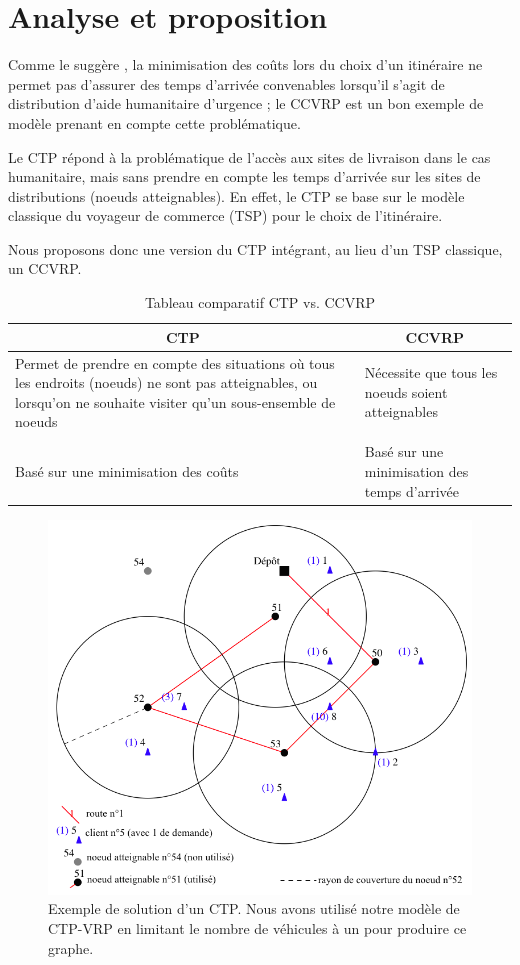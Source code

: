 \documentclass[12pt, a4paper, onecolumn, twoside,french,cleardoublepage=plain,openany]{article}
\begin{document}
\section{Analyse et proposition}

Comme le suggère \cite{campbell_routing_2008}, la minimisation des coûts lors du choix d’un itinéraire ne permet pas d’assurer des temps d’arrivée convenables lorsqu’il s’agit de distribution d’aide humanitaire d’urgence ; le CCVRP est un bon exemple de modèle prenant en compte cette problématique.

Le CTP répond à la problématique de l’accès aux sites de livraison dans le cas humanitaire, mais sans prendre en compte les temps d’arrivée sur les sites de distributions (noeuds atteignables). En effet, le CTP se base sur le modèle classique du voyageur de commerce (TSP) pour le choix de l’itinéraire.

Nous proposons donc une version du CTP intégrant, au lieu d’un TSP classique, un CCVRP.
\begin{table}[h] \centering \begin{tabular}{p{8cm} p{5cm}} \toprule
\multicolumn{1}{c}{CTP} & \multicolumn{1}{c}{CCVRP} \\ \midrule
Permet de prendre en compte des situations où tous les endroits (noeuds) ne sont pas atteignables, ou lorsqu'on ne souhaite visiter qu'un sous-ensemble de noeuds & Nécessite que tous les noeuds soient atteignables \\ \\
Basé sur une minimisation des coûts & Basé sur une minimisation des temps d'arrivée \\ \bottomrule
\end{tabular} \caption{Tableau comparatif CTP vs. CCVRP} \label{comparatif}
\end{table}

\begin{figure}[H] \centering
	\includegraphics[width=0.999\textwidth]{figures/ctp_sans_vrp}
	\caption[]{Exemple de solution d'un CTP. Nous avons utilisé notre modèle de CTP-VRP en limitant le nombre de véhicules à un pour produire ce graphe.} \label{fig_ctp_sans_vrp} 
\end{figure}
\end{document}
